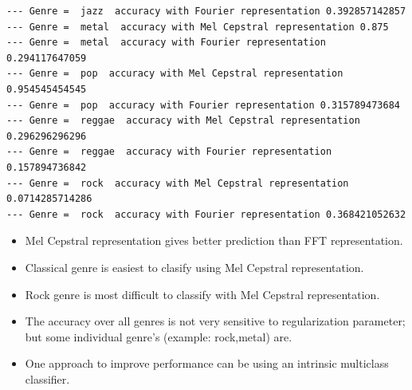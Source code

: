 \documentclass{article}
\begin{document}
\begin{tiny}
\begin{lstlisting}
--- Genre =  jazz  accuracy with Fourier representation 0.392857142857
--- Genre =  metal  accuracy with Mel Cepstral representation 0.875
--- Genre =  metal  accuracy with Fourier representation 0.294117647059
--- Genre =  pop  accuracy with Mel Cepstral representation 0.954545454545
--- Genre =  pop  accuracy with Fourier representation 0.315789473684
--- Genre =  reggae  accuracy with Mel Cepstral representation 0.296296296296
--- Genre =  reggae  accuracy with Fourier representation 0.157894736842
--- Genre =  rock  accuracy with Mel Cepstral representation 0.0714285714286
--- Genre =  rock  accuracy with Fourier representation 0.368421052632
\end{lstlisting}
\end{tiny}

\begin{itemize}
\item Mel Cepstral representation gives better prediction than FFT representation.
\item Classical genre is easiest to clasify using Mel Cepstral representation.
\item Rock genre is most difficult to classify with Mel Cepstral representation.
\item The accuracy over all genres is not very sensitive to regularization parameter; but some individual genre's (example: rock,metal) are.
\item One approach to improve performance can be using an intrinsic multiclass classifier.
\end{itemize}
\end{document}

